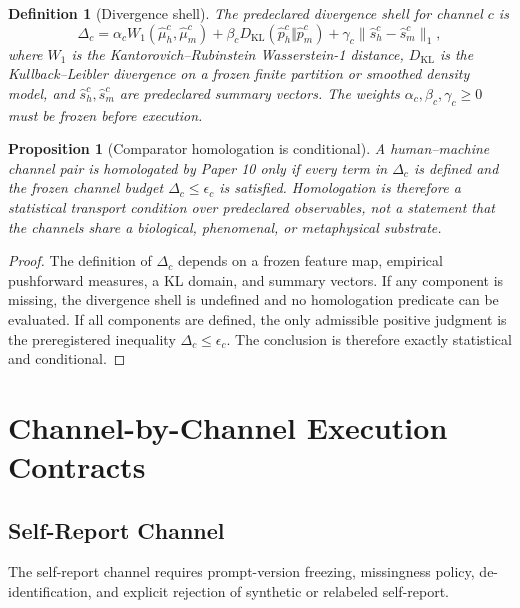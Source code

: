\documentclass[11pt,a4paper]{article}
\newtheorem{definition}[theorem]{Definition}
\newtheorem{proposition}[theorem]{Proposition}
\begin{document}
\begin{definition}[Divergence shell]
The predeclared divergence shell for channel $c$ is
\begin{equation}
\Delta_c =
\alpha_c W_1(\widehat{\mu}_h^c,\widehat{\mu}_m^c)
+\beta_c D_{\mathrm{KL}}(\widehat{p}_h^c\Vert\widehat{p}_m^c)
+\gamma_c\|\widehat{s}_h^c-\widehat{s}_m^c\|_1,
\end{equation}
where $W_1$ is the Kantorovich--Rubinstein Wasserstein-1 distance,
$D_{\mathrm{KL}}$ is the Kullback--Leibler divergence on a frozen finite
partition or smoothed density model, and $\widehat{s}_h^c,\widehat{s}_m^c$ are
predeclared summary vectors. The weights
$\alpha_c,\beta_c,\gamma_c\geq0$ must be frozen before execution.
\end{definition}

\begin{proposition}[Comparator homologation is conditional]
A human--machine channel pair is homologated by Paper 10 only if every term in
$\Delta_c$ is defined and the frozen channel budget
$\Delta_c\leq\epsilon_c$ is satisfied. Homologation is therefore a statistical
transport condition over predeclared observables, not a statement that the
channels share a biological, phenomenal, or metaphysical substrate.
\end{proposition}

\begin{proof}
The definition of $\Delta_c$ depends on a frozen feature map, empirical
pushforward measures, a KL domain, and summary vectors. If any component is
missing, the divergence shell is undefined and no homologation predicate can be
evaluated. If all components are defined, the only admissible positive judgment
is the preregistered inequality $\Delta_c\leq\epsilon_c$. The conclusion is
therefore exactly statistical and conditional.
\end{proof}

\section{Channel-by-Channel Execution Contracts}

\subsection{Self-Report Channel}

The self-report channel requires prompt-version freezing, missingness policy,
de-identification, and explicit rejection of synthetic or relabeled
self-report.
\end{document}
